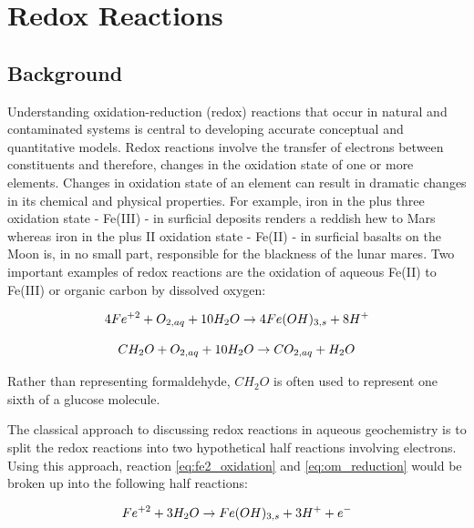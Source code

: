 \chapter{Redox Reactions}
\def\shorttitle{Redox Reactions} 
\section[Background]{Background}

Understanding oxidation-reduction (redox) reactions that occur in natural 
and contaminated systems is central to developing accurate conceptual and 
quantitative models. Redox reactions involve the transfer of electrons 
between constituents and therefore, changes in the oxidation state of 
one or more elements. Changes in oxidation state of an element can 
result in dramatic changes in its chemical and physical properties.  
For example, iron in the plus three oxidation 
state - Fe(III) - in surficial deposits renders 
a reddish hew to Mars whereas iron in the plus II oxidation 
state - Fe(II) - in surficial basalts on the Moon is, in no 
small part, responsible for the blackness of the lunar mares. 
Two important examples of redox reactions are the oxidation 
of aqueous Fe(II) to Fe(III) or organic carbon by dissolved oxygen:

\begin{equation}
4Fe^{+2} + O_{2,aq} + 10H_2O \rightarrow 4Fe(OH)_{3,s} + 8H^+  \\
\label{eq:fe2_oxidation}
\end{equation}

\begin{equation}
CH_2O  + O_{2,aq} + 10H_2O \rightarrow CO_{2,aq} + H_2O \\
\label{eq:om_reduction}
\end{equation}

Rather than representing formaldehyde, $CH_2O$ is often used to represent 
one sixth of a glucose molecule.

The classical approach to discussing redox reactions in aqueous geochemistry 
is to split the redox reactions into two hypothetical 
half reactions involving electrons. 
Using this approach, reaction \ref{eq:fe2_oxidation} and \ref{eq:om_reduction} 
would be broken up into the following half reactions:

\begin{equation}
Fe^{+2} + 3H_2O  \rightarrow Fe(OH)_{3,s} + 3H^+ + e^-  \\
\label{eq:fe_half_reac}
\end{equation}

